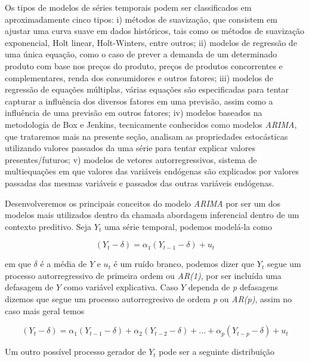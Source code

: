 \documentclass[twocolumn]{rbef}
\newcommand{\1}{\mathbbm{1}}
\begin{document}
Os tipos de modelos de séries temporais podem ser classificados em aproximadamente cinco tipos\cite{Gujarati}: i) métodos de suavização, que consistem em ajustar uma curva suave em dados históricos\cite{Hyndman}, tais como os métodos de suavização exponencial\cite{Brown}, Holt linear\cite{Holt}, Holt-Winters\cite{Winters}, entre outros; ii) modelos de regressão de uma única equação, como o caso de prever a demanda de um determinado produto com base nos preços do produto, preços de produtos concorrentes e complementares, renda dos consumidores e outros fatores; iii) modelos de regressão de equações múltiplas, várias equações são especificadas para tentar capturar a influência dos diversos fatores em uma previsão, assim como a influência de uma previsão em outros fatores; iv) modelos baseados na metodologia de Box e Jenkins\cite{Box-Jenkins}, tecnicamente conhecidos como modelos \textit{ARIMA}, que trataremos mais na presente seção, analisam as propriedades estocásticas utilizando valores passados da uma série para tentar explicar valores presentes/futuros; v) modelos de vetores autorregressivos, sistema de multiequações em que valores das variáveis endógenas são explicados por valores passadas das mesmas variáveis e passados das outras variáveis endógenas.

Desenvolveremos os principais conceitos do modelo \textit{ARIMA} por ser um dos modelos mais utilizados dentro da chamada abordagem inferencial dentro de um contexto preditivo. Seja $Y_{t}$ uma série temporal, podemos modelá-la como

\begin{equation}
    (Y_{t} - \delta) = \alpha_{1} (Y_{t-1} - \delta) + u_{t}
\end{equation}

em que $\delta$ é a média de $Y$ e $u_{t}$ é um ruído branco, podemos dizer que $Y_{t}$ segue um processo autorregressivo de primeira ordem ou \textit{AR(1)}, por ser incluída uma defasagem de $Y$ como variável explicativa. Caso $Y$ dependa de \textit{p} defasagens dizemos que segue um processo autorregresivo de ordem \textit{p} ou \textit{AR(p)}, assim no caso mais geral temos

\begin{equation}
    (Y_{t} - \delta) = \alpha_{1} (Y_{t-1} - \delta) + \alpha_{2} (Y_{t-2} - \delta)+ ... + \alpha_{p} (Y_{t-p} - \delta) + u_{t}
\end{equation}

Um outro possível processo gerador de $Y_{t}$ pode ser a seguinte distribuição
\end{document}
